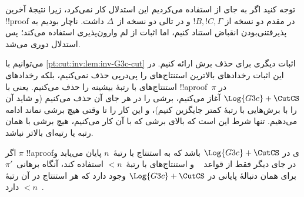 \documentclass[../../../include/open-logic-section]{subfiles}
\begin{document}
توجه کنید اگر به جای \CutCS از \Cut{} استفاده می‌کردیم این استدلال
کار نمی‌کرد، زیرا نتیجهٔ آخرین !!{proof} در مقدم دو نسخه از
$!B,!C,\Gamma$ و در تالی دو نسخه از~$\Delta$ داشت. ناچار بودیم به
پذیرفتنی‌بودن انقباض استناد کنیم، اما اثبات
 از لم وارون‌پذیری استفاده می‌کند؛
پس استدلال دوری می‌شد.

می‌توانیم با \cref{pt:cut:inv:lem:inv-G3c-cut} اثبات دیگری برای حذف
برش ارائه کنیم. در این اثبات رخدادهای بالاترین استنتاج‌های \CutCS{}
را پی‌درپی حذف نمی‌کنیم، بلکه رخدادهای استنتاج‌های \CutCS{} با رتبهٔ
بیشینه را حذف می‌کنیم. یعنی با !!a{proof}~$\pi$ در
$\Log{G3c}+\CutCS$ آغاز می‌کنیم، برشی را در هر جای آن حذف می‌کنیم
(و شاید آن را با برش‌هایی با رتبهٔ کمتر جایگزین کنیم)، و این کار را
تا وقتی هیچ برشی نماند ادامه می‌دهیم. تنها شرط این است که بالای برشی
که با آن کار می‌کنیم، هیچ برشی با همان رتبه یا رتبه‌ای بالاتر نباشد.

\begin{lem}
اگر $\pi$ !!a{proof}ی در $\Log{G3c}+\CutCS$ باشد که به استنتاج
\CutCS{} با رتبهٔ~$n$ پایان می‌یابد و در جای دیگر فقط از قواعد
~ و استنتاج‌های \CutCS{} با رتبهٔ~$<n$ استفاده کند، آنگاه
برهانی~$\pi'$ برای همان دنبالهٔ پایانی در
$\Log{G3c}+\CutCS$ وجود دارد که هر استنتاج \CutCS{} در آن رتبهٔ
~$<n$ دارد.
\end{lem}
\end{document}
